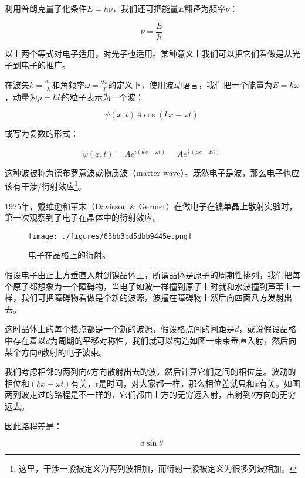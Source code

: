 利用普朗克量子化条件$E = h \nu$，我们还可把能量$E$翻译为频率$\nu$：

\begin{equation}
\nu = \frac{E }{h }~
\end{equation}

以上两个等式对电子适用，对光子也适用。某种意义上我们可以把它们看做是从光子到电子的推广。

在波矢$k = \frac{2 \pi }{\lambda}$和角频率$\omega = \frac{2 \pi }{T }$的定义下，使用波动语言，我们把一个能量为$E = \hbar \omega$，动量为$p = \hbar k$的粒子表示为一个波：

\begin{equation}
\psi( x, t ) A \cos ( k x - \omega t )~
\end{equation}

或写为复数的形式：

\begin{equation}
\psi (x,t ) = A e^{i ( k x - \omega t )} = A e^{\frac{i }{\hbar } (p x - E t) }~
\end{equation}

这种波被称为德布罗意波或物质波（matter wave）。既然电子是波，那么电子也应该有干涉/衍射效应\footnote{这里，干涉一般被定义为两列波相加，而衍射一般被定义为很多列波相加。}。

1925年，戴维逊和革末（Davisson \& Germer）在做电子在镍单晶上散射实验时，第一次观察到了电子在晶体中的衍射效应。

\begin{figure}[ht]
\centering
\texttt{[image: ./figures/63bb3bd5dbb9445e.png]}
\caption{电⼦在晶格上的衍射。} \label{fig_QMPre5_10}
\end{figure}

假设电子由正上方垂直入射到镍晶体上，所谓晶体是原子的周期性排列，我们把每个原子都想象为一个障碍物，当电子如波一样撞到原子上时就和水波撞到芦苇上一样，我们可把障碍物看做是个新的波源，波撞在障碍物上然后向四面八方发射出去。

这时晶体上的每个格点都是一个新的波源，假设格点间的间距是$d$，或说假设晶格中存在着以$d$为周期的平移对称性，我们就可以构造如图一束束垂直入射，然后向某个方向$\theta $散射的电子波束。

我们考虑相邻的两列向$\theta$方向散射出去的波，然后计算它们之间的相位差。波动的相位和$(k x - \omega t)$有关，$t$是时间，对大家都一样，那么相位差就只和$x$有关。如图两列波走过的路程是不一样的，它们都由上方的无穷远入射，出射到$\theta$方向的无穷远去。

因此路程差是：

\begin{equation}
d \sin \theta~
\end{equation}

